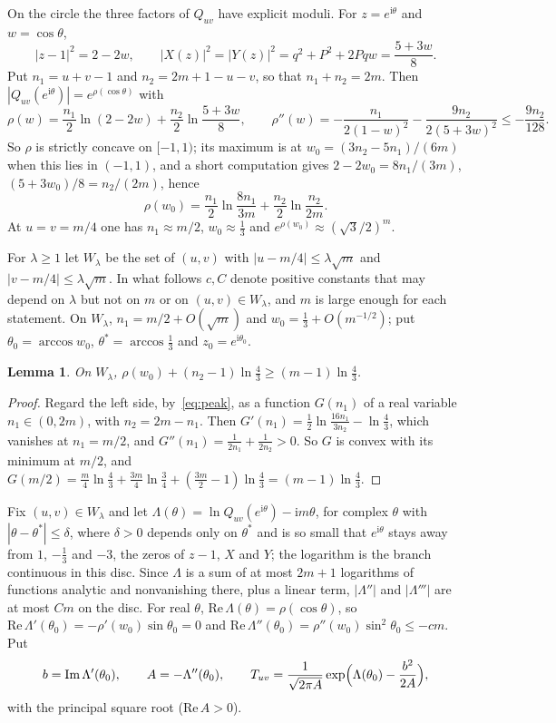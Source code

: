 \documentclass[11pt]{amsart}
\newtheorem{lemma}[theorem]{Lemma}
\theoremstyle{remark}
\newcommand{\ii}{\mathrm{i}}
\begin{document}
On the circle the three factors of $Q_{uv}$ have explicit moduli. For $z=e^{\ii\theta}$ and $w=\cos\theta$,
\[
|z-1|^2=2-2w,\qquad |X(z)|^2=|Y(z)|^2=q^2+P^2+2Pqw=\frac{5+3w}8 .
\]
Put $n_1=u+v-1$ and $n_2=2m+1-u-v$, so that $n_1+n_2=2m$. Then $|Q_{uv}(e^{\ii\theta})|=e^{\rho(\cos\theta)}$ with
\[
\rho(w)=\frac{n_1}2\ln(2-2w)+\frac{n_2}2\ln\frac{5+3w}8,\qquad
\rho''(w)=-\frac{n_1}{2(1-w)^2}-\frac{9n_2}{2(5+3w)^2}\le-\frac{9n_2}{128}.
\]
So $\rho$ is strictly concave on $[-1,1)$; its maximum is at $w_0=(3n_2-5n_1)/(6m)$ when this lies in $(-1,1)$, and a
short computation gives $2-2w_0=8n_1/(3m)$, $(5+3w_0)/8=n_2/(2m)$, hence
\begin{equation}\label{eq:peak}
\rho(w_0)=\frac{n_1}2\ln\frac{8n_1}{3m}+\frac{n_2}2\ln\frac{n_2}{2m}.
\end{equation}
At $u=v=m/4$ one has $n_1\approx m/2$, $w_0\approx\frac13$ and $e^{\rho(w_0)}\approx(\sqrt3/2)^m$.

For $\lambda\ge1$ let $W_\lambda$ be the set of $(u,v)$ with $|u-m/4|\le\lambda\sqrt m$ and $|v-m/4|\le\lambda\sqrt m$.
In what follows $c,C$ denote positive constants that may depend on $\lambda$ but not on $m$ or on $(u,v)\in W_\lambda$,
and $m$ is large enough for each statement. On $W_\lambda$, $n_1=m/2+O(\sqrt m)$ and $w_0=\frac13+O(m^{-1/2})$; put
$\theta_0=\arccos w_0$, $\theta^*=\arccos\frac13$ and $z_0=e^{\ii\theta_0}$.

\begin{lemma}\label{lem:exponent}
On $W_\lambda$, $\rho(w_0)+(n_2-1)\ln\frac43\ge(m-1)\ln\frac43$.
\end{lemma}

\begin{proof}
Regard the left side, by~\eqref{eq:peak}, as a function $G(n_1)$ of a real variable $n_1\in(0,2m)$, with $n_2=2m-n_1$.
Then $G'(n_1)=\frac12\ln\frac{16n_1}{3n_2}-\ln\frac43$, which vanishes at $n_1=m/2$, and
$G''(n_1)=\frac1{2n_1}+\frac1{2n_2}>0$. So $G$ is convex with its minimum at $m/2$, and
$G(m/2)=\frac m4\ln\frac43+\frac{3m}4\ln\frac34+(\frac{3m}2-1)\ln\frac43=(m-1)\ln\frac43$.
\end{proof}

Fix $(u,v)\in W_\lambda$ and let $\Lambda(\theta)=\ln Q_{uv}(e^{\ii\theta})-\ii m\theta$, for complex $\theta$ with
$|\theta-\theta^*|\le\delta$, where $\delta>0$ depends only on $\theta^*$ and is so small that $e^{\ii\theta}$ stays away from $1$, $-\frac13$ and $-3$,
the zeros of $z-1$, $X$ and $Y$; the logarithm is the branch continuous in this disc. Since $\Lambda$ is a sum of at most
$2m+1$ logarithms of functions analytic and nonvanishing there, plus a linear term, $|\Lambda''|$ and $|\Lambda'''|$ are
at most $Cm$ on the disc. For real $\theta$, $\mathrm{Re}\,\Lambda(\theta)=\rho(\cos\theta)$, so
$\mathrm{Re}\,\Lambda'(\theta_0)=-\rho'(w_0)\sin\theta_0=0$ and
$\mathrm{Re}\,\Lambda''(\theta_0)=\rho''(w_0)\sin^2\theta_0\le-cm$. Put
\[
b=\mathrm{Im}\,\Lambda'(\theta_0),\qquad A=-\Lambda''(\theta_0),\qquad
T_{uv}=\frac{1}{\sqrt{2\pi A}}\exp\Bigl(\Lambda(\theta_0)-\frac{b^2}{2A}\Bigr),
\]
with the principal square root ($\mathrm{Re}\,A>0$).
\end{document}
